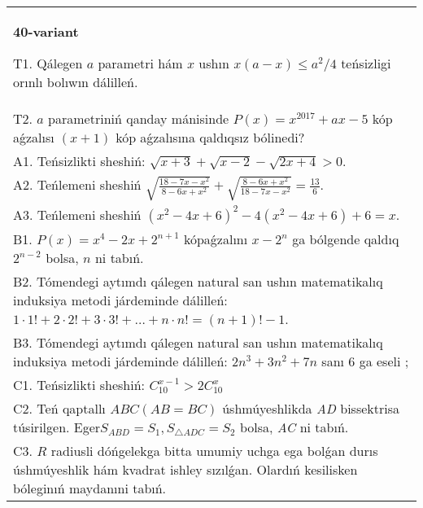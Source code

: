 \documentclass{article}
\begin{document}
\begin{tabular}{m{17cm}}
\textbf{40-variant}
\newline

T1. Qálegen \(a\) parametri hám \(x\) ushın \(x(a - x) \leq a^{2}/4\) teńsizligi orınlı bolıwın dálilleń. \\
T2. \(a\) parametriniń qanday mánisinde \(P(x) = x^{2017} + ax - 5\) kóp aǵzalısı \((x + 1)\) kóp aǵzalısına qaldıqsız bólinedi? \\
A1. Teńsizlikti sheshiń: \(\sqrt{x + 3} + \sqrt{x - 2} - \sqrt{2x + 4} > 0\). \\
A2. Teńlemeni sheshiń \(\sqrt{\frac{18 - 7x - x^{2}}{8 - 6x + x^{2}}} + \sqrt{\frac{8 - 6x + x^{2}}{18 - 7x - x^{2}}} = \frac{13}{6}\). \\
A3. Teńlemeni sheshiń \(\left( x^{2} - 4x + 6 \right)^{2} - 4\left( x^{2} - 4x + 6 \right) + 6 = x\). \\
B1. \(P(x) = x^{4} - 2x + 2^{n + 1}\) kópaǵzalını \(x - 2^{n}\) ga bólgende qaldıq \(2^{n - 2}\) bolsa, \(n\) ni tabıń. \\
B2. Tómendegi aytımdı qálegen natural san ushın matematikalıq induksiya metodi járdeminde dálilleń: \(1 \cdot 1! + 2 \cdot 2! + 3 \cdot 3! + \ldots + n \cdot n! = (n + 1)! - 1\). \\
B3. Tómendegi aytımdı qálegen natural san ushın matematikalıq induksiya metodi járdeminde dálilleń: \(2n^{3} + 3n^{2} + 7n\) sanı 6 ga eseli ; \\
C1. Teńsizlikti sheshiń: \(C_{10}^{x - 1} > 2C_{10}^{x}\) \\
C2. Teń qaptallı \(ABC(AB = BC)\) úshmúyeshlikda \emph{AD} bissektrisa túsirilgen. Eger\(S_{ABD} = S_{1},S_{\bigtriangleup ADC} = S_{2}\) bolsa, \emph{AC} ni tabıń. \\
C3. \(R\) radiusli dóńgelekga bitta umumiy uchga ega bolǵan durıs úshmúyeshlik hám kvadrat ishley sızılǵan. Olardıń kesilisken bóleginıń maydanıni tabıń. \\

\end{tabular}
\vspace{1cm}
\end{document}

